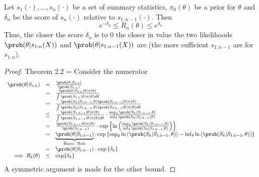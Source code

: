 \documentclass[11pt,a4paper]{article}
\begin{document}
  \begin{theorem}{}
    Let $s_{1}(\cdot),\dots,s_n(\cdot)$ be a set of summary statistics, $\pi_0(\theta)$ be a prior for $\theta$ and $\delta_n$ be the score of $s_n(\cdot)$ relative to $s_{1:n-1}(\cdot)$. Then
    \[ e^{-\delta_n}\leq R_n(\theta)\leq e^{\delta_n} \]
    Thus, the closer the score $\delta_n$ is to $0$ the closer in value the two likelihoods $\prob(\theta|s_{1:n}(X))$ and  $\prob(\theta|s_{1:n-1}(X))$ are (the more sufficient $s_{1:n-1}$ are for $s_{1:n}$).
  \end{theorem}

  \begin{proof}{Theorem 2.2}
    \everymath={\displaystyle}
    Consider the numerator
    \[\begin{array}{rcl}
      \prob(\theta|S_{1:k})&=&\frac{\prob(\theta,S_{1:k})}{\prob(S_{1:k})}\\
      &=&\frac{\prob(\theta,S_{1:k}|\theta)\pi(\theta)}{\int\prob(S_{1:k}|\theta)\pi(\theta)d\theta}\\
      &=&\frac{\prob(S_k|S_{1:k-1},\theta)\prob(S_{1:k-1}|\theta)\pi(\theta)}{\int\prob(S_k|S_{1:k-1},\theta)\prob(S_{1:k-1}|\theta)\pi(\theta)d\theta}\\
      &\leq&\frac{\prob(S_{1:k-1}|\theta)\pi(\theta)}{\int\prob(S_{1:k-1}|\theta)\pi(\theta)d\theta}\cdot\frac{\sup_\theta\prob(S_k|S_{1:k-1},\theta)}{\inf_\theta\prob(S_k|S_{1:k-1},\theta)}\\
      &=&\frac{\prob(S_{1:k-1}|\theta)\pi(\theta)}{\prob(S_{1:k-1})}\cdot\exp\left\{\ln\left(\frac{\sup_\theta\prob(S_k|S_{1:k-1},\theta)}{\inf_\theta\prob(S_k|S_{1:k-1},\theta)}\right)\right\}\\
      &=&\underbrace{\prob(\theta|S_{1:k-1})}_\text{Bayes' Rule}\cdot\exp\left\{\sup_\theta\ln\left(\prob(S_k|S_{1:k-1},\theta)\right)-\inf_\theta\ln\left(\prob(S_k|S_{1:k-1},\theta)\right)\right\}\\
      &=&\prob(\theta|S_{1:k-1})\cdot\exp\left\{\delta_k\right\}\\
      \implies R_k(\theta)&\leq&\exp\{\delta_k\}
    \end{array}\]
    A symmetric argument is made for the other bound.
  \end{proof}
\end{document}
